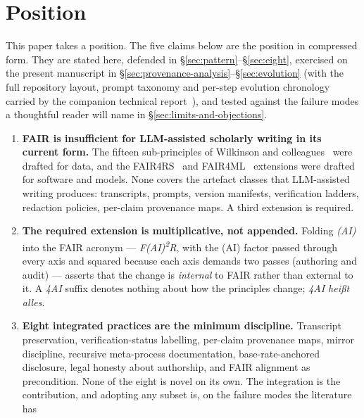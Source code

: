 \section{Position}
\label{sec:position}

This paper takes a position. The five claims below are the position
in compressed form. They are stated here, defended in
\S\ref{sec:pattern}--\S\ref{sec:eight}, exercised on the present
manuscript in \S\ref{sec:provenance-analysis}--\S\ref{sec:evolution}
(with the full repository layout, prompt taxonomy and per-step
evolution chronology carried by the companion technical
report~\cite{krebs2026faiarcompanion}), and tested against the
failure modes a thoughtful reader will name in
\S\ref{sec:limits-and-objections}.

\begin{enumerate}[leftmargin=1.6em,itemsep=2pt,topsep=4pt]
  \item \textbf{FAIR is insufficient for LLM-assisted scholarly
        writing in its current form.} The fifteen sub-principles of
        Wilkinson and colleagues~\cite{wilkinson2016fair} were drafted
        for data, and the FAIR4RS~\cite{chuehong2022fair4rs} and
        FAIR4ML~\cite{ravi2024fair4ml} extensions were drafted for
        software and models. None covers the artefact classes that
        LLM-assisted writing produces: transcripts, prompts, version
        manifests, verification ladders, redaction policies, per-claim
        provenance maps. A third extension is required.
  \item \textbf{The required extension is multiplicative, not
        appended.} Folding \emph{(AI)} into the FAIR acronym ---
        \emph{F(AI)\textsuperscript{2}R}, with the (AI) factor passed
        through every axis and squared because each axis demands two
        passes (authoring and audit) --- asserts that the change is
        \emph{internal} to FAIR rather than external to it. A
        \emph{4AI} suffix denotes nothing about how the principles
        change; \emph{4AI heißt alles}.
  \item \textbf{Eight integrated practices are the minimum
        discipline.} Transcript preservation, verification-status
        labelling, per-claim provenance maps, mirror discipline,
        recursive meta-process documentation, base-rate-anchored
        disclosure, legal honesty about authorship, and FAIR
        alignment as precondition. None of the eight is novel on its
        own. The integration is the contribution, and adopting any
        subset is, on the failure modes the literature has

\end{enumerate}
